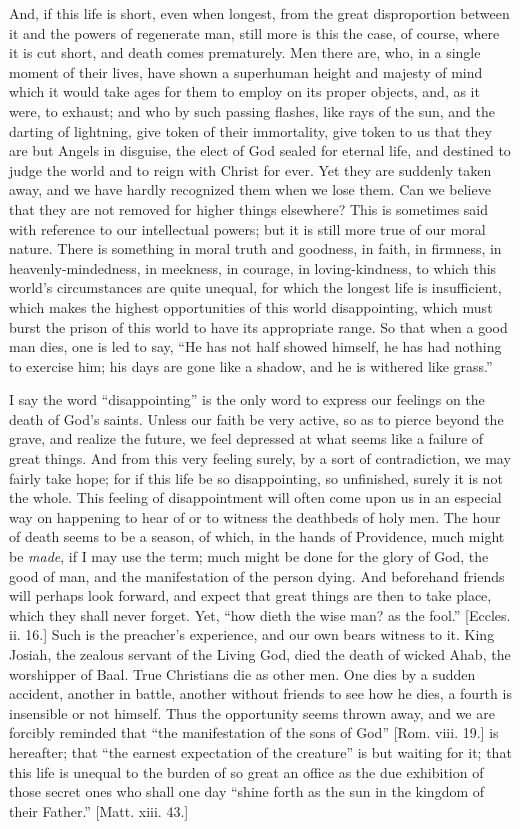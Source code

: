 And, if this life is short, even when longest, from the great
disproportion between it and the powers of regenerate man, still more
is this the case, of course, where it is cut short, and death comes
prematurely. Men there are, who, in a single moment of their lives,
have shown a superhuman height and majesty of mind which it would take
ages for them to employ on its proper objects, and, as it were, to
exhaust; and who by such passing flashes, like rays of the sun, and
the darting of lightning, give token of their immortality, give token
to us that they are but Angels in disguise, the elect of God sealed
for eternal life, and destined to judge the world and to reign with
Christ for ever. Yet they are suddenly taken away, and we have hardly
recognized them when we lose them. Can we believe that they are not
removed for higher things elsewhere? This is sometimes said with
reference to our intellectual powers; but it is still more true of our
moral nature. There is something in moral truth and goodness, in
faith, in firmness, in heavenly-mindedness, in meekness, in courage,
in loving-kindness, to which this world's circumstances are quite
unequal, for which the longest life is insufficient, which makes the
highest opportunities of this world disappointing, which must burst
the prison of this world to have its appropriate range. So that when a
good man dies, one is led to say, ``He has not half showed
himself, he has had nothing to exercise him; his days are gone like a
shadow, and he is withered like grass.''

I say the word ``disappointing'' is the only word to
express our feelings on the death of God's saints. Unless our faith be
very active, so as to pierce beyond the grave, and realize the future,
we feel depressed at what seems like a failure of great things. And
from this very feeling surely, by a sort of contradiction, we may
fairly take hope; for if this life be so disappointing, so unfinished,
surely it is not the whole. This feeling of disappointment will often
come upon us in an especial way on happening to hear of or to witness
the deathbeds of holy men. The hour of death seems to be a season, of
which, in the hands of Providence, much might be \emph{made}, if I may
use the term; much might be done for the glory of God, the good of
man, and the manifestation of the person dying. And beforehand friends
will perhaps look forward, and expect that great things are then to
take place, which they shall never forget. Yet, ``how dieth the
wise man? as the fool.'' [Eccles. ii. 16.] Such is the preacher's
experience, and our own bears witness to it. King Josiah, the zealous
servant of the Living God, died the death of wicked Ahab, the
worshipper of Baal. True Christians die as other men. One dies by a
sudden accident, another in battle, another without friends to see how
he dies, a fourth is insensible or not himself. Thus the opportunity
seems thrown away, and we are forcibly reminded that ``the
manifestation of the sons of God'' [Rom. viii. 19.] is hereafter;
that ``the earnest expectation of the creature'' is but
waiting for it; that this life is unequal to the burden of so great an
office as the due exhibition of those secret ones who shall one day
``shine forth as the sun in the kingdom of their Father.''
[Matt. xiii. 43.]

